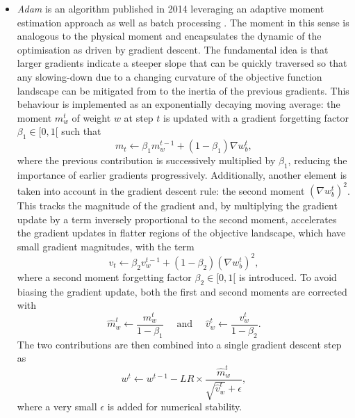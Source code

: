 \begin{itemize}[leftmargin=*]
    \item \textit{Adam} is an algorithm published in 2014 leveraging an adaptive moment estimation approach as well as batch processing \cite{adamPaper}. The moment in this sense is analogous to the physical moment and encapsulates the dynamic of the optimisation as driven by gradient descent. The fundamental idea is that larger gradients indicate a steeper slope that can be quickly traversed so that any slowing-down due to a changing curvature of the objective function landscape can be mitigated from to the inertia of the previous gradients. This behaviour is implemented as an exponentially decaying moving average: the moment $m^t_w$ of weight $w$ at step $t$ is updated with a gradient forgetting factor $\beta_1 \in [0, 1[$ such that \[ m_t \leftarrow \beta_1 m^{t-1}_w + (1 - \beta_1) \nabla w_b^t,\] where the previous contribution is successively multiplied by $\beta_1$, reducing the importance of earlier gradients progressively. Additionally, another element is taken into account in the gradient descent rule: the second moment $(\nabla w_b^t)^2$. This tracks the magnitude of the gradient and, by multiplying the gradient update by a term inversely proportional to the second moment, accelerates the gradient updates in flatter regions of the objective landscape, which have small gradient magnitudes, with the term \[ v_t \leftarrow \beta_2 v^{t-1}_w + (1 - \beta_2) (\nabla w_b^t)^2,\] where a second moment forgetting factor $\beta_2 \in [0, 1[$ is introduced. To avoid biasing the gradient update, both the first and second moments are corrected with \[\hat{m}^t_w \leftarrow \frac{m^t_w}{1 - \beta_1} \quad \text{ and } \quad  \hat{v}^t_w \leftarrow \frac{v^t_w}{1 - \beta_2}.\] The two contributions are then combined into a single gradient descent step as
    \begin{equation}\label{eq:adam}
        w^{t} \leftarrow w^{t-1} - LR \times \frac{\hat{m}^t_w}{\sqrt{\hat{v}^t_w} + \epsilon},
    \end{equation}
    where a very small $\epsilon$ is added for numerical stability.
\end{itemize}

